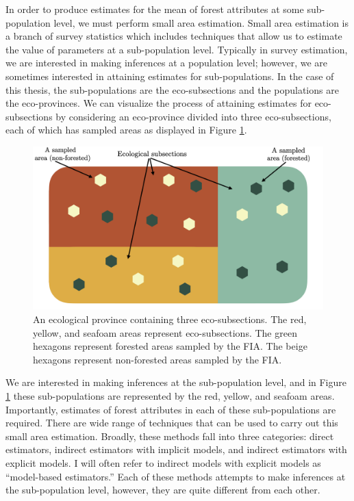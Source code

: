 \documentclass[12pt,twoside]{reedthesis}
\begin{document}
In order to produce estimates for the mean of forest attributes at some sub-population level, we must perform small area estimation. Small area estimation is a branch of survey statistics which includes techniques that allow us to estimate the value of parameters at a sub-population level. Typically in survey estimation, we are interested in making inferences at a population level; however, we are sometimes interested in attaining estimates for sub-populations. In the case of this thesis, the sub-populations are the eco-subsections and the populations are the eco-provinces. We can visualize the process of attaining estimates for eco-subsections by considering an eco-province divided into three eco-subsections, each of which has sampled areas as displayed in Figure \ref{fig:ecological-province-diagram}.
\begin{figure}

{\centering \includegraphics[width=1\linewidth]{figure/ecoprov-diagram} 

}

\caption[An ecological province]{An ecological province containing three eco-subsections. The red, yellow, and seafoam areas represent eco-subsections. The green hexagons represent forested areas sampled by the FIA. The beige hexagons represent non-forested areas sampled by the FIA.}\label{fig:ecological-province-diagram}
\end{figure}
We are interested in making inferences at the sub-population level, and in Figure \ref{fig:ecological-province-diagram} these sub-populations are represented by the red, yellow, and seafoam areas. Importantly, estimates of forest attributes in each of these sub-populations are required. There are wide range of techniques that can be used to carry out this small area estimation. Broadly, these methods fall into three categories: direct estimators, indirect estimators with implicit models, and indirect estimators with explicit models. I will often refer to indirect models with explicit models as ``model-based estimators.'' Each of these methods attempts to make inferences at the sub-population level, however, they are quite different from each other.
\end{document}
